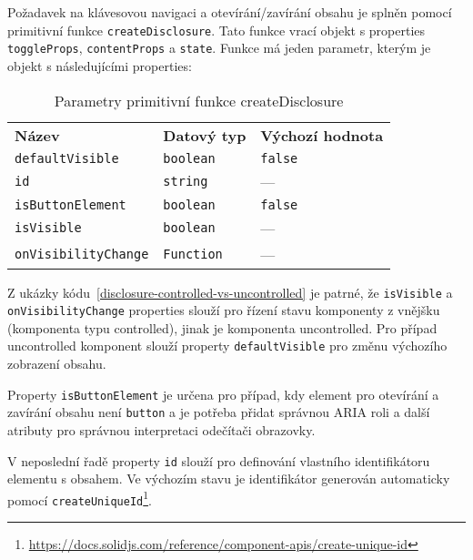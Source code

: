 Požadavek na klávesovou navigaci \hyperref[ofr11]{} a otevírání/zavírání obsahu \hyperref[dfr11]{} je splněn pomocí primitivní funkce \texttt{createDisclosure}.
Tato funkce vrací objekt s properties \texttt{toggleProps}, \texttt{contentProps} a \texttt{state}.
Funkce má jeden parametr, kterým je objekt s následujícími properties:

\begin{table}[ht]\label{table:disclosure-params}
    \begin{ctucolortab}
        \begin{tabularx}{\textwidth}{X X X}
            \bfseries Název             & \bfseries Datový typ & \bfseries Výchozí hodnota \\\Midrule{}
            \texttt{defaultVisible}     & \texttt{boolean}     & \texttt{false}            \\
            \texttt{id}                 & \texttt{string}      & ---                       \\
            \texttt{isButtonElement}    & \texttt{boolean}     & \texttt{false}            \\
            \texttt{isVisible}          & \texttt{boolean}     & ---                       \\
            \texttt{onVisibilityChange} & \texttt{Function}    & ---
        \end{tabularx}
    \end{ctucolortab}
    \caption{Parametry primitivní funkce createDisclosure}
\end{table}

Z ukázky kódu~\ref{disclosure-controlled-vs-uncontrolled} je patrné, že \texttt{isVisible} a \texttt{onVisibilityChange} properties slouží pro řízení stavu komponenty z vnějšku (komponenta typu controlled), jinak je komponenta uncontrolled.
Pro případ uncontrolled komponent slouží property \texttt{defaultVisible} pro změnu výchozího zobrazení obsahu.

Property \texttt{isButtonElement} je určena pro případ, kdy element pro otevírání a zavírání obsahu není \texttt{button} a je potřeba přidat správnou ARIA roli a další atributy pro správnou interpretaci odečítači obrazovky.

V neposlední řadě property \texttt{id} slouží pro definování vlastního identifikátoru elementu s obsahem.
Ve výchozím stavu je identifikátor generován automaticky pomocí \texttt{createUniqueId}\footnote{\url{https://docs.solidjs.com/reference/component-apis/create-unique-id}}.

